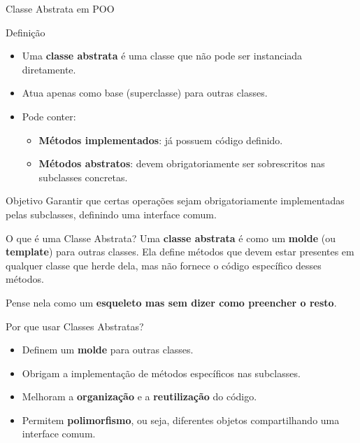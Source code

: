 \begin{frame}{Classe Abstrata em POO}

\begin{block}{Definição}
\begin{itemize}
    \item Uma \textbf{classe abstrata} é uma classe que não pode ser instanciada diretamente.
    \item Atua apenas como base (superclasse) para outras classes.
    \item Pode conter:
    \begin{itemize}
        \item \textbf{Métodos implementados}: já possuem código definido.
        \item \textbf{Métodos abstratos}: devem obrigatoriamente ser sobrescritos nas subclasses concretas.
    \end{itemize}
\end{itemize}
\end{block}

\begin{block}{Objetivo}
Garantir que certas operações sejam obrigatoriamente implementadas pelas subclasses, definindo uma interface comum.
\end{block}

\end{frame}

\begin{frame}{O que é uma Classe Abstrata?}
    Uma \textbf{classe abstrata} é como um \textbf{molde} (ou \textbf{template}) para outras classes.  
    Ela define métodos que devem estar presentes em qualquer classe que herde dela, 
    mas não fornece o código específico desses métodos.
    
    \vspace{0.3cm}
    Pense nela como um \textbf{esqueleto mas sem dizer como preencher o resto}.
\end{frame}


\begin{frame}{Por que usar Classes Abstratas?}
    \begin{itemize}
        \item Definem um \textbf{molde} para outras classes.
        \item Obrigam a implementação de métodos específicos nas subclasses.
        \item Melhoram a \textbf{organização} e a \textbf{reutilização} do código.
        \item Permitem \textbf{polimorfismo}, ou seja, diferentes objetos 
              compartilhando uma interface comum.
    \end{itemize}
\end{frame}



